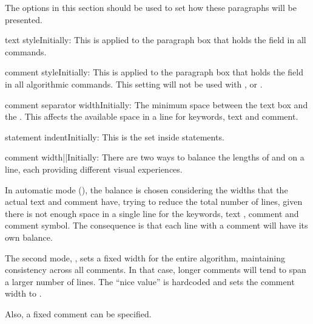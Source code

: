 \documentclass[a4paper, 11pt]{article}
\begin{document}
\medskip
The options in this section should be used to set how these paragraphs will be presented.

\begin{Optiondef}{text style}{}{Initially: \PDInline{\RaggedRight}}
    This  is applied to the paragraph box that holds the  field in all commands.
\end{Optiondef}

\begin{Optiondef}{comment style}{}{Initially: \PDInline{\RaggedRight}}
    This  is applied to the paragraph box that holds the  field in all algorithmic commands. This setting will not be used with ,  or .
\end{Optiondef}

\begin{Optiondef}{comment separator width}{}{Initially: \PDInline{1em}}
    The minimum space between the text box and the . This affects the available space in a line for keywords, text and comment.
\end{Optiondef}

\begin{Optiondef}{statement indent}{}{Initially: \PDInline{1em}}
    This is the  set inside  statements.
\end{Optiondef}

\begin{Optiondef}{comment width}{||}{Initially: }
    There are two ways to balance the lengths of  and  on a line, each providing different visual experiences.

    In automatic mode (), the balance is chosen considering the widths that the actual text and comment have, trying to reduce the total number of lines, given there is not enough space in a single line for the keywords, text , comment and comment symbol. The consequence is that each line with a comment will have its own balance.

    The second mode, , sets a fixed width for the entire algorithm, maintaining consistency across all comments. In that case, longer comments will tend to span a larger number of lines. The ``nice value'' is hardcoded and sets the comment width to .

    Also, a fixed comment  can be specified.
\end{Optiondef}
\end{document}

